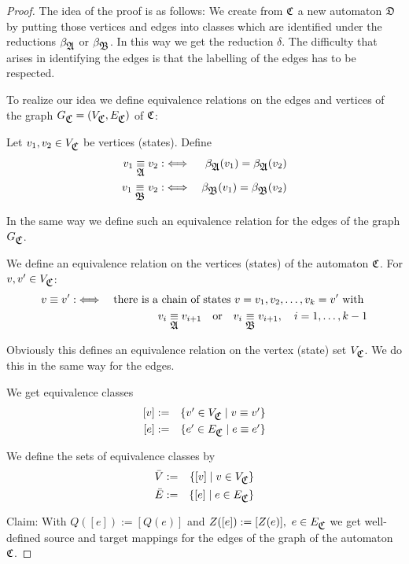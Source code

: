 \begin{proof}
The idea of the proof is as follows: We create from $\mbox{$\mathfrak{C}$}$ a new automaton
$\mbox{$\mathfrak{D}$}$ by putting those vertices and edges into classes which are identified
under the reductions $\beta_{\mbox{$\mathfrak{A}$}}$ or $\beta_{\mbox{$\mathfrak{B}$}}$. In this way we get 
the reduction $\delta$. The difficulty that arises in identifying the edges is 
that the labelling of the edges has to be respected.

To realize our idea we define equivalence relations on the edges and vertices of
the graph $G_{\mbox{$\mathfrak{C}$}} = (V_{\mbox{$\mathfrak{C}$}}, E_{\mbox{$\mathfrak{C}$}})$ of $\mbox{$\mathfrak{C}$}$:

Let $v_1, v_2 \in V_{\mbox{$\mathfrak{C}$}}$ be vertices (states). Define
\begin{eqnarray*}
v_1 \underset{\mbox{$\mathfrak{A}$}}{\equiv} v_2 & : \iff & \beta_{\mbox{$\mathfrak{A}$}}(v_1) = \beta_{\mbox{$\mathfrak{A}$}}(v_2) \\
v_1 \underset{\mbox{$\mathfrak{B}$}}{\equiv} v_2 & : \iff & \beta_{\mbox{$\mathfrak{B}$}}(v_1) = \beta_{\mbox{$\mathfrak{B}$}}(v_2)
\end{eqnarray*}

In the same way we define such an equivalence relation for the edges of the
graph $G_{\mbox{$\mathfrak{C}$}}$.

We define an equivalence relation on the vertices (states) of the automaton
$\mbox{$\mathfrak{C}$}$. For $v, v' \in V_{\mbox{$\mathfrak{C}$}}$:
\begin{eqnarray*}
v \equiv v' & :\iff & \text{there is a chain of states } v = v_1, v_2, \ldots,
v_k = v'\text{ with } \\
& & v_i \underset{\mbox{$\mathfrak{A}$}}{\equiv} v_{i+1}\text{\quad or\quad }v_i \underset{\mbox{$\mathfrak{B}$}}{\equiv} v_{i+1},\quad i
= 1, \ldots, k-1
\end{eqnarray*} 

Obviously this defines an equivalence relation on the vertex (state) set
$V_{\mbox{$\mathfrak{C}$}}$. We do this in the same way for the edges.

We get equivalence classes
\begin{eqnarray*}
\left[ v \right] & := & \mbox{$\{v' \in V_{\mbox{$\mathfrak{C}$}} \mid v \equiv v'\}$} \\
\left[ e \right] & := & \mbox{$\{e' \in E_{\mbox{$\mathfrak{C}$}} \mid e \equiv e'\}$}
\end{eqnarray*}

We define the sets of equivalence classes by
\begin{eqnarray*}
\bar{V} & := & \mbox{$\{[v] \mid v \in V_{\mbox{$\mathfrak{C}$}}\}$} \\ 
\bar{E} & := & \mbox{$\{[e] \mid e \in E_{\mbox{$\mathfrak{C}$}}\}$} 
\end{eqnarray*}

Claim: With $Q([e]) := [Q(e)]$ and $Z([e]) := [Z(e)],\ e \in E_{\mbox{$\mathfrak{C}$}}$ we get
well-defined source and target mappings for the edges of the graph of
the automaton $\mbox{$\mathfrak{C}$}$.


\end{proof}
